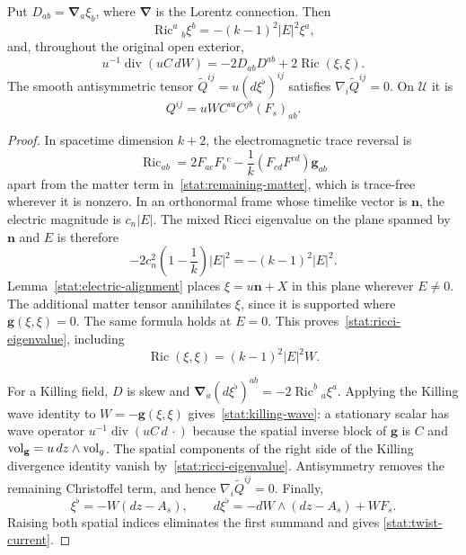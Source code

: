\begin{lemma}
\label{stat:killing-identities}
Put $D_{ab}=\boldsymbol\nabla_a\xi_b$, where
$\boldsymbol\nabla$ is the Lorentz connection.  Then
\begin{equation}
 \operatorname{Ric}^{a}{}_{b}\xi^b
      =-(k-1)^2|E|^2\xi^a,
 \label{stat:ricci-eigenvalue}
\end{equation}
and, throughout the original open exterior,
\begin{equation}
 u^{-1}\operatorname{div}(uC\,dW)
   =-2D_{ab}D^{ab}+2\operatorname{Ric}(\xi,\xi).
 \label{stat:killing-wave}
\end{equation}
The smooth antisymmetric tensor
$\widetilde Q^{ij}=u(d\xi^\flat)^{ij}$ satisfies
$\nabla_i\widetilde Q^{ij}=0$.  On $\mathcal U$ it is
\begin{equation}
 Q^{ij}=uW C^{ia}C^{jb}(F_s)_{ab}.
 \label{stat:twist-current}
\end{equation}
\end{lemma}

\begin{proof}
In spacetime dimension $k+2$, the electromagnetic trace reversal is
\[
 \operatorname{Ric}_{ab}
   =2F_{ac}F_b{}^c-\frac1k(F_{cd}F^{cd})\mathbf g_{ab}
\]
apart from the matter term in~\eqref{stat:remaining-matter}, which is
trace-free wherever it is nonzero.  In an orthonormal frame whose
timelike vector is $\mathbf n$, the electric magnitude is $c_n|E|$.
The mixed Ricci eigenvalue on the plane spanned by $\mathbf n$ and
$E$ is therefore
\[
 -2c_n^2\left(1-\frac1k\right)|E|^2
   =-(k-1)^2|E|^2.
\]
Lemma~\ref{stat:electric-alignment} places
$\xi=u\mathbf n+X$ in this plane wherever $E\ne0$.  The additional
matter tensor annihilates $\xi$, since it is supported where
$\mathbf g(\xi,\xi)=0$.  The same formula holds at $E=0$.
This proves~\eqref{stat:ricci-eigenvalue}, including
\begin{equation}
 \operatorname{Ric}(\xi,\xi)=(k-1)^2|E|^2W.
 \label{stat:ricci-null-contraction}
\end{equation}

For a Killing field, $D$ is skew and
$\boldsymbol\nabla_a(d\xi^\flat)^{ab}
=-2\operatorname{Ric}^{b}{}_{a}\xi^a$.
Applying the Killing wave identity to $W=-\mathbf g(\xi,\xi)$
gives~\eqref{stat:killing-wave}: a stationary scalar has wave
operator $u^{-1}\operatorname{div}(uC\,d\,\cdot)$ because the
spatial inverse block of $\mathbf g$ is $C$ and
$\operatorname{vol}_{\mathbf g}=u\,dz\wedge\operatorname{vol}_g$.
The spatial components of the right side of the Killing divergence
identity vanish by~\eqref{stat:ricci-eigenvalue}.  Antisymmetry
removes the remaining Christoffel term, and hence
$\nabla_i\widetilde Q^{ij}=0$.
Finally,
\[
 \xi^\flat=-W(dz-A_s),\qquad
 d\xi^\flat=-dW\wedge(dz-A_s)+WF_s.
\]
Raising both spatial indices eliminates the first summand and gives
\eqref{stat:twist-current}.
\end{proof}

